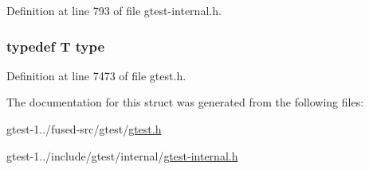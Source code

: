 \-Definition at line 793 of file gtest-\/internal.\-h.

\hypertarget{structtesting_1_1internal_1_1RemoveConst_a565429e62c1d4fd084335146ba778e17}{
\subsubsection[{type}]{\setlength{\rightskip}{0pt plus 5cm}typedef \-T {\bf type}}}\label{de/d54/structtesting_1_1internal_1_1RemoveConst_a565429e62c1d4fd084335146ba778e17}


\-Definition at line 7473 of file gtest.\-h.



\-The documentation for this struct was generated from the following files\-:\begin{DoxyCompactItemize}
\item 
gtest-\/1../fused-\/src/gtest/\hyperlink{fused-src_2gtest_2gtest_8h}{gtest.\-h}\item 
gtest-\/1../include/gtest/internal/\hyperlink{gtest-internal_8h}{gtest-\/internal.\-h}\end{DoxyCompactItemize}
